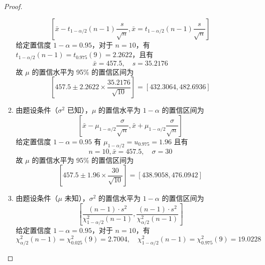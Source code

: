 \documentclass[normal,founder,mtpro2,cn]{elegantnote}
\begin{document}
\begin{enumerate}
\begin{proof}
\begin{enumerate}
\begin{equation*}
                          \left[\bar{x}-t_{1-\alpha/2}(n-1)\frac{s}{\sqrt{n}},\bar{x}=t_{1-\alpha/2}(n-1)\frac{s}{\sqrt{n}}\right]
                      \end{equation*}
                      给定置信度 $1-\alpha=0.95$，对于 $n=10$，有 $t_{1-\alpha/2}(n-1)=t_{0.975}(9)=2.2622$，且有
                      \begin{equation*}
                          \bar{x}=457.5,\quad s=35.2176
                      \end{equation*}
                      故 $\mu$ 的置信水平为 95\% 的置信区间为
                      \begin{equation*}
                          \left[457.5\pm 2.2622\times\frac{35.2176}{\sqrt{10}}\right]=[432.3064,482.6936]
                      \end{equation*}
                \item 由题设条件（$\sigma^{2}$ 已知），$\mu$ 的置信水平为 $1-\alpha$ 的置信区间为
                      \begin{equation*}
                          \left[\bar{x}-\mu_{1-\alpha/2}\frac{\sigma}{\sqrt{n}},\bar{x}+\mu_{1-\alpha/2}\frac{\sigma}{\sqrt{n}}\right]
                      \end{equation*}
                      给定置信度 $1-\alpha=0.95$ 有 $\mu_{1-\alpha/2}=u_{0.975}=1.96$  且有
                      \begin{equation*}
                          n=10,\bar{x}=457.5, \quad \sigma=30
                      \end{equation*}
                      故 $\mu$ 的置信水平为 95\% 的置信区间为
                      \begin{equation*}
                          \left[457.5 \pm 1.96\times\frac{30}{\sqrt{10}}\right]=[438.9058,476.0942]
                      \end{equation*}
                \item 由题设条件（$\mu$ 未知），$\sigma^{2}$ 的置信水平为 $1-\alpha$ 的置信区间为
                      \begin{equation*}
                          \left[\frac{(n-1)\cdot s^{2}}{\chi_{1-\alpha/2}^{2}(n-1)},\frac{(n-1)\cdot s^{2}}{\chi_{\alpha/2}^{2}(n-1)}\right]
                      \end{equation*}
                      给定置信度 $1-\alpha=0.95$，对于 $n=10$，有
                      \begin{equation*}
                          \chi_{\alpha/2}^{2}(n-1)=\chi_{0.025}^{2}(9)=2.7004, \quad\chi_{1-\alpha/2}^{2}(n-1)=\chi_{0.975}^{2}(9)=19.0228

\end{equation*}
\end{enumerate}
\end{proof}
\end{enumerate}
\end{document}
